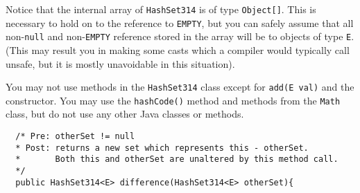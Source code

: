 \documentclass[12pt,letter]{article}
\begin{document}
\vspace{4pt}
\noindent Notice that the internal array of \texttt{HashSet314} is of type \texttt{Object[]}. This is necessary to hold on to the 
reference to \texttt{EMPTY}, but you can safely assume that all non-\texttt{null} and non-\texttt{EMPTY} reference stored in the array
will be to objects of type \texttt{E}. (This may result you in making some casts which a compiler would typically call unsafe, but it is mostly
unavoidable in this situation).

\vspace{4pt}

\noindent You may not use methods in the \texttt{HashSet314} class except for \texttt{add(E val)} and the constructor.
\noindent You may use the \texttt{hashCode()} method and methods from the \texttt{Math} class, but do not use any other Java classes or methods.

\clearpage
\begin{verbatim}
  /* Pre: otherSet != null
  * Post: returns a new set which represents this - otherSet.
  *       Both this and otherSet are unaltered by this method call.
  */
  public HashSet314<E> difference(HashSet314<E> otherSet){
\end{verbatim}
\end{document}
